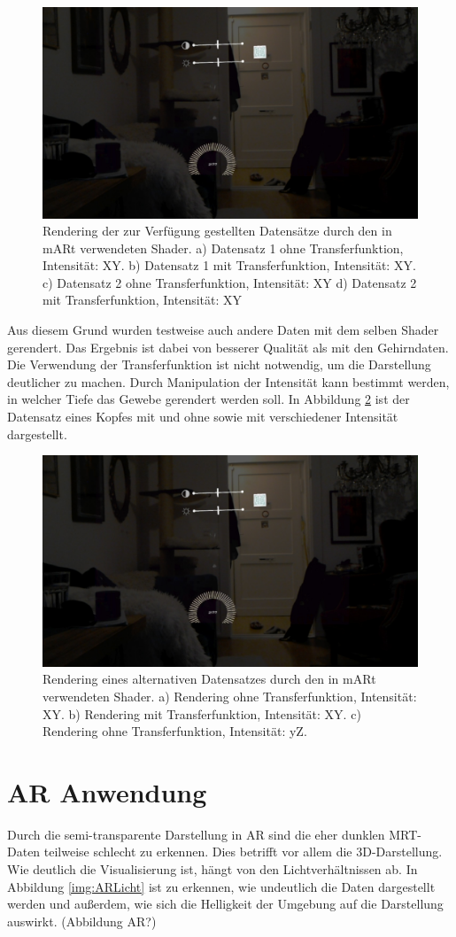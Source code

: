 \begin{figure}[!htb]
	\centering
	\includegraphics[width=0.5\linewidth]{images/hololens2D.jpg}
	\caption{Rendering der zur Verfügung gestellten Datensätze durch den in mARt verwendeten Shader. a) Datensatz 1 ohne Transferfunktion, Intensität: XY. b) Datensatz 1 mit Transferfunktion, Intensität: XY. c) Datensatz 2 ohne Transferfunktion, Intensität: XY d) Datensatz 2 mit Transferfunktion, Intensität: XY}
	\label{img:result}
\end{figure}
\FloatBarrier
  
Aus diesem Grund wurden testweise auch andere Daten mit dem selben Shader gerendert. Das Ergebnis ist dabei von besserer Qualität als mit den Gehirndaten. Die Verwendung der Transferfunktion ist nicht notwendig, um die Darstellung deutlicher zu machen. Durch Manipulation der Intensität kann bestimmt werden, in welcher Tiefe das Gewebe gerendert werden soll. In Abbildung \ref{img:resultsVisMale} ist der Datensatz eines Kopfes mit und ohne sowie mit verschiedener Intensität dargestellt.
  
\begin{figure}[!htb]
	\centering
	\includegraphics[width=0.5\linewidth]{images/hololens2D.jpg}
	\caption{Rendering eines alternativen Datensatzes durch den in mARt verwendeten Shader. a) Rendering ohne Transferfunktion, Intensität: XY. b) Rendering mit Transferfunktion, Intensität: XY. c) Rendering ohne Transferfunktion, Intensität: yZ.}
	\label{img:resultsVisMale}
\end{figure}
\FloatBarrier
  
\section{AR Anwendung}
Durch die semi-transparente Darstellung in AR sind die eher dunklen MRT-Daten teilweise schlecht zu erkennen. Dies betrifft vor allem die 3D-Darstellung. Wie deutlich die Visualisierung ist, hängt von den Lichtverhältnissen ab. In Abbildung \ref{img:ARLicht} ist zu erkennen, wie undeutlich die Daten dargestellt werden und außerdem, wie sich die Helligkeit der Umgebung auf die Darstellung auswirkt. (Abbildung AR?)

